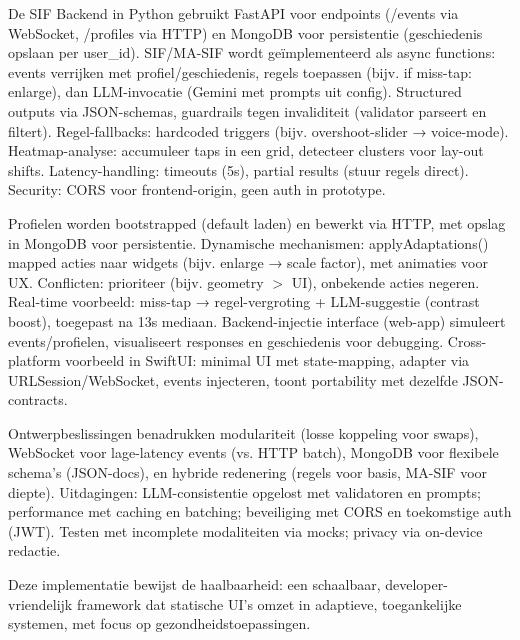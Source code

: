 \documentclass[openany]{book}
\begin{document}
De SIF Backend in Python gebruikt FastAPI voor endpoints (/events via WebSocket, /profiles via HTTP) en MongoDB voor persistentie (geschiedenis opslaan per user\_id). SIF/MA-SIF wordt geïmplementeerd als async functions: events verrijken met profiel/geschiedenis, regels toepassen (bijv. if miss-tap: enlarge), dan LLM-invocatie (Gemini met prompts uit config). Structured outputs via JSON-schemas, guardrails tegen invaliditeit (validator parseert en filtert). Regel-fallbacks: hardcoded triggers (bijv. overshoot-slider → voice-mode). Heatmap-analyse: accumuleer taps in een grid, detecteer clusters voor lay-out shifts. Latency-handling: timeouts (5s), partial results (stuur regels direct). Security: CORS voor frontend-origin, geen auth in prototype.

Profielen worden bootstrapped (default laden) en bewerkt via HTTP, met opslag in MongoDB voor persistentie. Dynamische mechanismen: applyAdaptations() mapped acties naar widgets (bijv. enlarge → scale factor), met animaties voor UX. Conflicten: prioriteer (bijv. geometry $>$ UI), onbekende acties negeren. Real-time voorbeeld: miss-tap → regel-vergroting + LLM-suggestie (contrast boost), toegepast na 13s mediaan.
Backend-injectie interface (web-app) simuleert events/profielen, visualiseert responses en geschiedenis voor debugging. Cross-platform voorbeeld in SwiftUI: minimal UI met state-mapping, adapter via URLSession/WebSocket, events injecteren, toont portability met dezelfde JSON-contracts.

Ontwerpbeslissingen benadrukken modulariteit (losse koppeling voor swaps), WebSocket voor lage-latency events (vs. HTTP batch), MongoDB voor flexibele schema's (JSON-docs), en hybride redenering (regels voor basis, MA-SIF voor diepte). Uitdagingen: LLM-consistentie opgelost met validatoren en prompts; performance met caching en batching; beveiliging met CORS en toekomstige auth (JWT). Testen met incomplete modaliteiten via mocks; privacy via on-device redactie.

Deze implementatie bewijst de haalbaarheid: een schaalbaar, developer-vriendelijk framework dat statische UI's omzet in adaptieve, toegankelijke systemen, met focus op gezondheidstoepassingen.
\end{document}
